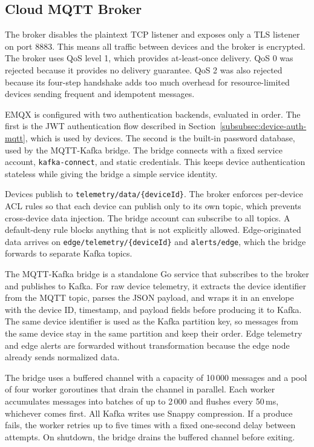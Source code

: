 \subsection{Cloud \gls{MQTT} Broker}
\label{subsec:CloudMQTTImpl}

The broker disables the plaintext TCP listener and exposes only a \gls{TLS} listener on port 8883. This means all traffic between devices and the broker is encrypted. The broker uses \gls{QoS} level 1, which provides at-least-once delivery. \gls{QoS} 0 was rejected because it provides no delivery guarantee. \gls{QoS} 2 was also rejected because its four-step handshake adds too much overhead for resource-limited devices sending frequent and idempotent messages.

EMQX is configured with two authentication backends, evaluated in order. The first is the \gls{JWT} authentication flow described in Section~\ref{subsubsec:device-auth-mqtt}, which is used by devices. The second is the built-in password database, used by the \gls{MQTT}-Kafka bridge. The bridge connects with a fixed service account, \texttt{kafka-connect}, and static credentials. This keeps device authentication stateless while giving the bridge a simple service identity.

Devices publish to \texttt{telemetry/data/\{deviceId\}}. The broker enforces per-device \gls{ACL} rules so that each device can publish only to its own topic, which prevents cross-device data injection. The bridge account can subscribe to all topics. A default-deny rule blocks anything that is not explicitly allowed. Edge-originated data arrives on \texttt{edge/telemetry/\{deviceId\}} and \texttt{alerts/edge}, which the bridge forwards to separate Kafka topics.

The \gls{MQTT}-Kafka bridge is a standalone Go service that subscribes to the broker and publishes to Kafka. For raw device telemetry, it extracts the device identifier from the \gls{MQTT} topic, parses the \gls{JSON} payload, and wraps it in an envelope with the device \gls{ID}, timestamp, and payload fields before producing it to Kafka. The same device identifier is used as the Kafka partition key, so messages from the same device stay in the same partition and keep their order. Edge telemetry and edge alerts are forwarded without transformation because the edge node already sends normalized data.

The bridge uses a buffered channel with a capacity of 10\,000 messages and a pool of four worker goroutines that drain the channel in parallel. Each worker accumulates messages into batches of up to 2\,000 and flushes every 50\,ms, whichever comes first. All Kafka writes use Snappy compression. If a produce fails, the worker retries up to five times with a fixed one-second delay between attempts. On shutdown, the bridge drains the buffered channel before exiting.

